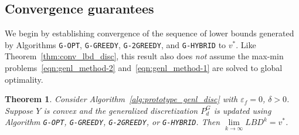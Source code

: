 \documentclass{article}
\newcommand{\uset}[2]{\ensuremath{\underset{#1}{#2}}}
\newcommand{\1}[1]{\mathds{1}\left[#1\right]}
\newtheorem{theorem}{Theorem}[]
\begin{document}
\subsection{Convergence guarantees}


We begin by establishing convergence of the sequence of lower bounds generated by Algorithms \texttt{G-OPT}, \texttt{G-GREEDY}, \texttt{G-2GREEDY}, and \texttt{G-HYBRID} to $v^*$.
Like Theorem~\ref{thm:conv_lbd_disc}, this result also does \textit{not} assume the max-min problems~\eqref{eqn:genl_method-2} and~\eqref{eqn:genl_method-1} are solved to global optimality.



\begin{theorem}
\label{thm:conv_lbd_genl_disc}
Consider Algorithm~\ref{alg:prototype_genl_disc} with $\varepsilon_f = 0$, $\delta > 0$.
Suppose $Y$ is convex and the generalized discretization $P^G_d$ is updated using Algorithm \texttt{G-OPT}, \texttt{G-GREEDY}, \texttt{G-2GREEDY}, or \texttt{G-HYBRID}.
Then $\uset{k \to \infty}{\lim} LBD^k = v^*$.
\end{theorem}
\end{document}
